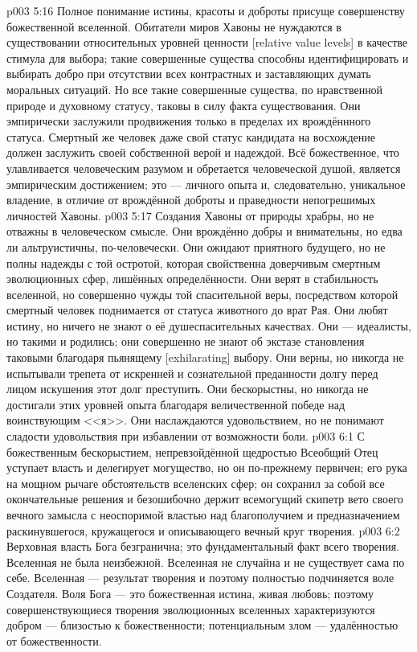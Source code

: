 \vs p003 5:16 \pc Полное понимание истины, красоты и доброты присуще совершенству божественной вселенной. Обитатели миров Хавоны не нуждаются в существовании относительных уровней ценности [relative value levels] в качестве стимула для выбора; такие совершенные существа способны идентифицировать и выбирать добро при отсутствии всех контрастных и заставляющих думать моральных ситуаций. Но все такие совершенные существа, по нравственной природе и духовному статусу, таковы в силу факта существования. Они эмпирически заслужили продвижения только в пределах их врождённного статуса. Смертный же человек даже свой статус кандидата на восхождение должен заслужить своей собственной верой и надеждой. Всё божественное, что улавливается человеческим разумом и обретается человеческой душой, является эмпирическим достижением; это ---  личного опыта и, следовательно, уникальное владение, в отличие от врождённой доброты и праведности непогрешимых личностей Хавоны.
\vs p003 5:17 \pc Создания Хавоны от природы храбры, но не отважны в человеческом смысле. Они врождённо добры и внимательны, но едва ли альтруистичны, по\hyp{}человечески. Они ожидают приятного будущего, но не полны надежды с той остротой, которая свойственна доверчивым смертным эволюционных сфер, лишённых определённости. Они верят в стабильность вселенной, но совершенно чужды той спасительной веры, посредством которой смертный человек поднимается от статуса животного до врат Рая. Они любят истину, но ничего не знают о её душеспасительных качествах. Они --- идеалисты, но такими и родились; они совершенно не знают об экстазе становления таковыми благодаря пьянящему [exhilarating] выбору. Они верны, но никогда не испытывали трепета от искренней и сознательной преданности долгу перед лицом искушения этот долг преступить. Они бескорыстны, но никогда не достигали этих уровней опыта благодаря величественной победе над воинствующим <<я>>. Они наслаждаются удовольствием, но не понимают сладости удовольствия при избавлении от возможности боли.
\vs p003 6:1 С божественным бескорыстием, непревзойдённой щедростью Всеобщий Отец уступает власть и делегирует могущество, но он по\hyp{}прежнему первичен; его рука на мощном рычаге обстоятельств вселенских сфер; он сохранил за собой все окончательные решения и безошибочно держит всемогущий скипетр вето своего вечного замысла с неоспоримой властью над благополучием и предназначением раскинувшегося, кружащегося и описывающего вечный круг творения.
\vs p003 6:2 Верховная власть Бога безгранична; это фундаментальный факт всего творения. Вселенная не была неизбежной. Вселенная не случайна и не существует сама по себе. Вселенная --- результат творения и поэтому полностью подчиняется воле Создателя. Воля Бога --- это божественная истина, живая любовь; поэтому совершенствующиеся творения эволюционных вселенных характеризуются добром --- близостью к божественности; потенциальным злом --- удалённостью от божественности.
